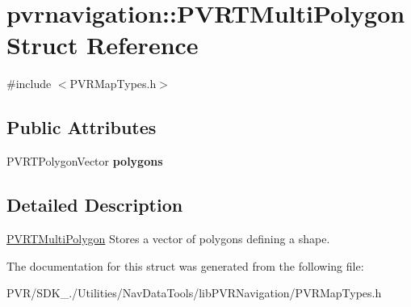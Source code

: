\hypertarget{structpvrnavigation_1_1_p_v_r_t_multi_polygon}{\section{pvrnavigation\+:\+:P\+V\+R\+T\+Multi\+Polygon Struct Reference}
\label{structpvrnavigation_1_1_p_v_r_t_multi_polygon}
}


{\ttfamily \#include $<$P\+V\+R\+Map\+Types.\+h$>$}

\subsection*{Public Attributes}
\begin{DoxyCompactItemize}
\item 
\hypertarget{structpvrnavigation_1_1_p_v_r_t_multi_polygon_ab0af5d27fe658fbdd8bfad6c90929c76}{P\+V\+R\+T\+Polygon\+Vector {\bfseries polygons}}\label{structpvrnavigation_1_1_p_v_r_t_multi_polygon_ab0af5d27fe658fbdd8bfad6c90929c76}

\end{DoxyCompactItemize}


\subsection{Detailed Description}


  \hyperlink{structpvrnavigation_1_1_p_v_r_t_multi_polygon}{P\+V\+R\+T\+Multi\+Polygon}  Stores a vector of polygons defining a shape. 

The documentation for this struct was generated from the following file\+:\begin{DoxyCompactItemize}
\item 
P\+V\+R/\+S\+D\+K\+\_./\+Utilities/\+Nav\+Data\+Tools/lib\+P\+V\+R\+Navigation/P\+V\+R\+Map\+Types.\+h\end{DoxyCompactItemize}
